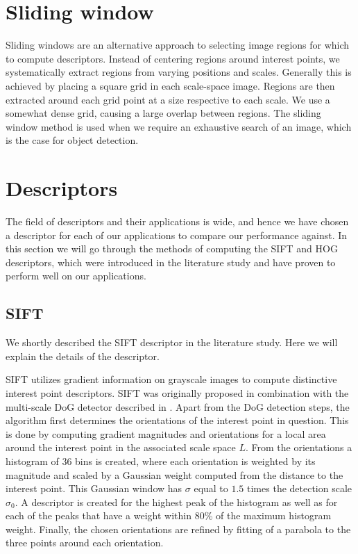 \documentclass[thesis.tex]{subfiles}
\begin{document}
\section{Sliding window}
\label{sec:slidingWindow}
%
Sliding windows are an alternative approach to selecting image regions for which to compute descriptors. Instead of centering regions around interest points, we systematically extract regions from varying positions and scales. Generally this is achieved by placing a square grid in each scale-space image. Regions are then extracted around each grid point at a size respective to each scale. We use a somewhat dense grid, causing a large overlap between regions. The sliding window method is used when we require an exhaustive search of an image, which is the case for object detection.

\section{Descriptors}

The field of descriptors and their applications is wide, and hence we have chosen a descriptor for each of our applications to compare our performance against. In this section we will go through the methods of computing the SIFT and HOG descriptors, which were introduced in the literature study and have proven to perform well on our applications.

\subsection{SIFT}

We shortly described the SIFT descriptor in the literature study. Here we will explain the details of the descriptor.

SIFT utilizes gradient information on grayscale images to compute distinctive interest point descriptors. SIFT was originally proposed in combination with the multi-scale DoG detector described in . Apart from the DoG detection steps, the algorithm first determines the orientations of the interest point in question. This is done by computing gradient magnitudes and orientations for a local area around the interest point in the associated scale space $L$. From the orientations a histogram of 36 bins is created, where each orientation is weighted by its magnitude and scaled by a Gaussian weight computed from the distance to the interest point. This Gaussian window has $\sigma$ equal to $1.5$ times the detection scale $\sigma_0$. A descriptor is created for the highest peak of the histogram as well as for each of the peaks that have a weight within 80\% of the maximum histogram weight. Finally, the chosen orientations are refined by fitting of a parabola to the three points around each orientation.
\end{document}
